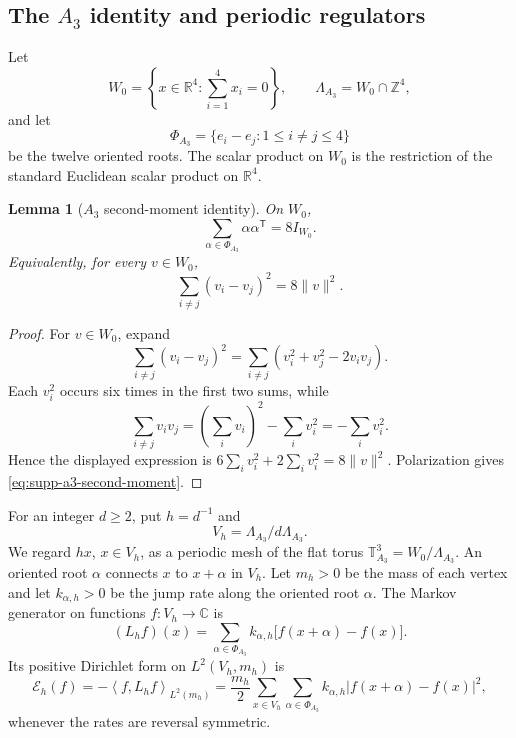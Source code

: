 \documentclass[11pt]{article}
\newtheorem{lemma}[lemma]{Lemma}
\theoremstyle{definition}
\theoremstyle{remark}
\newcommand{\Z}{\mathbb Z}
\newcommand{\R}{\mathbb R}
\newcommand{\C}{\mathbb C}
\newcommand{\norm}[1]{\lVert#1\rVert}
\newcommand{\abs}[1]{\lvert#1\rvert}
\newcommand{\ip}[2]{\left\langle #1,#2\right\rangle}
\begin{document}
\subsection{The \texorpdfstring{$A_3$}{A3} identity and periodic regulators}

Let
\begin{equation}
 W_0=\left\{x\in\R^4:\sum_{i=1}^4x_i=0\right\},
 \qquad
 \Lambda_{A_3}=W_0\cap\Z^4,
 \label{eq:supp-a3-lattice}
\end{equation}
and let
\begin{equation}
 \Phi_{A_3}=\{e_i-e_j:1\le i\ne j\le4\}
 \label{eq:supp-a3-oriented-roots}
\end{equation}
be the twelve oriented roots.  The scalar product on $W_0$ is the restriction
of the standard Euclidean scalar product on $\R^4$.

\begin{lemma}[$A_3$ second-moment identity]
\label{lem:supp-a3-second-moment}
On $W_0$,
\begin{equation}
 \boxed{\sum_{\alpha\in\Phi_{A_3}}
        \alpha\alpha^{\mathsf T}=8I_{W_0}.}
 \label{eq:supp-a3-second-moment}
\end{equation}
Equivalently, for every $v\in W_0$,
\begin{equation}
 \sum_{i\ne j}(v_i-v_j)^2=8\norm{v}^2.
 \label{eq:supp-a3-quadratic-identity}
\end{equation}
\end{lemma}

\begin{proof}
For $v\in W_0$, expand
\[
 \sum_{i\ne j}(v_i-v_j)^2
 =\sum_{i\ne j}(v_i^2+v_j^2-2v_iv_j).
\]
Each $v_i^2$ occurs six times in the first two sums, while
\[
 \sum_{i\ne j}v_iv_j
 =\left(\sum_i v_i\right)^2-\sum_i v_i^2
 =-\sum_i v_i^2.
\]
Hence the displayed expression is
$6\sum_i v_i^2+2\sum_i v_i^2=8\norm{v}^2$.
Polarization gives \eqref{eq:supp-a3-second-moment}.
\end{proof}

For an integer $d\ge2$, put $h=d^{-1}$ and
\begin{equation}
 V_h=\Lambda_{A_3}/d\Lambda_{A_3}.
 \label{eq:supp-periodic-vertices}
\end{equation}
We regard $hx$, $x\in V_h$, as a periodic mesh of the flat torus
$\mathbb T^3_{A_3}=W_0/\Lambda_{A_3}$.  An oriented root $\alpha$ connects
$x$ to $x+\alpha$ in $V_h$.  Let $m_h>0$ be the mass of each vertex and let
$k_{\alpha,h}>0$ be the jump rate along the oriented root $\alpha$.  The
Markov generator on functions $f:V_h\to\C$ is
\begin{equation}
 (L_hf)(x)
 =\sum_{\alpha\in\Phi_{A_3}}k_{\alpha,h}
  \bigl[f(x+\alpha)-f(x)\bigr].
 \label{eq:supp-root-generator}
\end{equation}
Its positive Dirichlet form on
$L^2(V_h,m_h)$ is
\begin{equation}
 \mathcal E_h(f)
 =-\ip{f}{L_hf}_{L^2(m_h)}
 =\frac{m_h}{2}\sum_{x\in V_h}
   \sum_{\alpha\in\Phi_{A_3}}k_{\alpha,h}
   \abs{f(x+\alpha)-f(x)}^2,
 \label{eq:supp-root-form}
\end{equation}
whenever the rates are reversal symmetric.
\end{document}
